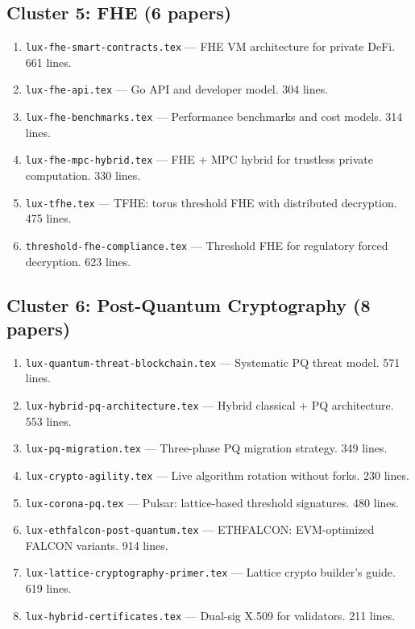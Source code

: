 \documentclass[11pt,a4paper]{article}
\begin{document}
\subsection{Cluster 5: FHE (6 papers)}
\begin{enumerate}[leftmargin=2em]
\item \texttt{lux-fhe-smart-contracts.tex} --- FHE VM architecture for private DeFi. 661 lines.
\item \texttt{lux-fhe-api.tex} --- Go API and developer model. 304 lines.
\item \texttt{lux-fhe-benchmarks.tex} --- Performance benchmarks and cost models. 314 lines.
\item \texttt{lux-fhe-mpc-hybrid.tex} --- FHE + MPC hybrid for trustless private computation. 330 lines.
\item \texttt{lux-tfhe.tex} --- TFHE: torus threshold FHE with distributed decryption. 475 lines.
\item \texttt{threshold-fhe-compliance.tex} --- Threshold FHE for regulatory forced decryption. 623 lines.
\end{enumerate}

\subsection{Cluster 6: Post-Quantum Cryptography (8 papers)}
\begin{enumerate}[leftmargin=2em]
\item \texttt{lux-quantum-threat-blockchain.tex} --- Systematic PQ threat model. 571 lines.
\item \texttt{lux-hybrid-pq-architecture.tex} --- Hybrid classical + PQ architecture. 553 lines.
\item \texttt{lux-pq-migration.tex} --- Three-phase PQ migration strategy. 349 lines.
\item \texttt{lux-crypto-agility.tex} --- Live algorithm rotation without forks. 230 lines.
\item \texttt{lux-corona-pq.tex} --- Pulsar: lattice-based threshold signatures. 480 lines.
\item \texttt{lux-ethfalcon-post-quantum.tex} --- ETHFALCON: EVM-optimized FALCON variants. 914 lines.
\item \texttt{lux-lattice-cryptography-primer.tex} --- Lattice crypto builder's guide. 619 lines.
\item \texttt{lux-hybrid-certificates.tex} --- Dual-sig X.509 for validators. 211 lines.
\end{enumerate}
\end{document}
